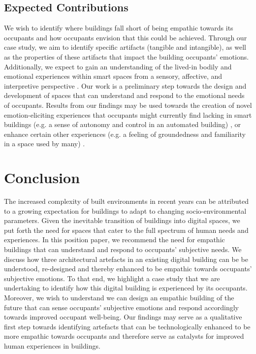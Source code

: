 \documentclass [sigconf] {acmart}
\begin{document}
\subsection{Expected Contributions}
We wish to identify where buildings fall short of being empathic towards its occupants and how occupants envision that this could be achieved. Through our case study, we aim to identify specific artifacts (tangible and intangible), as well as the properties of these artifacts that impact the building occupants' emotions. Additionally, we expect to gain an understanding of the lived-in bodily and emotional experiences within smart spaces from a sensory, affective, and interpretive perspective \cite{giaccardi2015foundations}. Our work is a preliminary step towards the design and development of spaces that can understand and respond to the emotional needs of occupants. Results from our findings may be used towards the creation of novel emotion-eliciting experiences that occupants might currently find lacking in smart buildings (e.g. a sense of autonomy and control in an automated building) \cite{moreno2014user}, or enhance certain other experiences (e.g. a feeling of groundedness and familiarity in a space used by many) \cite{rehman2022personalisedcomfort}.  

\section{Conclusion}
The increased complexity of built environments in recent years can be attributed to a growing expectation for buildings to adapt to changing socio-environmental parameters. Given the inevitable transition of buildings into digital spaces, we put forth the need for spaces that cater to the full spectrum of human needs and experiences. In this position paper, we recommend the need for empathic buildings that can understand and respond to occupants' subjective needs. We discuss how three architectural artefacts in an existing digital building can be be understood, re-designed and thereby enhanced to be empathic towards occupants' subjective emotions. To that end, we highlight a case study that we are undertaking to identify how this digital building is experienced by its occupants. Moreover, we wish to understand we can design an empathic building of the future that can sense occupants' subjective emotions and respond accordingly towards improved occupant well-being. Our findings may serve as a qualitative first step towards identifying artefacts that can be technologically enhanced to be more empathic towards occupants and therefore serve as catalysts for improved human experiences in buildings. 




\end{document}
